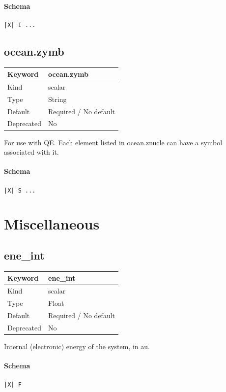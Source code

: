 \documentclass[11pt]{article}
\begin{document}
{{{{{\paragraph{Schema}
\begin{Verbatim}
|X| I ...
\end{Verbatim}

\subsection{ocean.zymb}
\label{kw:ocean-zymb}
\begin{longtable}{|p{1.5in}|p{4.5in}|}
\hline
Keyword & ocean.zymb \\
\hline
Kind & scalar \\
\hline
Type & String \\
\hline
Default & Required / No default \\
\hline
Deprecated & No \\
\hline
\end{longtable}
 For use with QE. Each element listed in ocean.znucle can have a symbol
 associated with it.

\paragraph{Schema}
\begin{Verbatim}
|X| S ...
\end{Verbatim}

\section{Miscellaneous}

\subsection{ene\_int}
\label{kw:ene-int}
\begin{longtable}{|p{1.5in}|p{4.5in}|}
\hline
Keyword & ene\_int \\
\hline
Kind & scalar \\
\hline
Type & Float \\
\hline
Default & Required / No default \\
\hline
Deprecated & No \\
\hline
\end{longtable}
 Internal (electronic) energy of the system, in au.

\paragraph{Schema}
\begin{Verbatim}
|X| F
\end{Verbatim}

}}}}}
\end{document}
